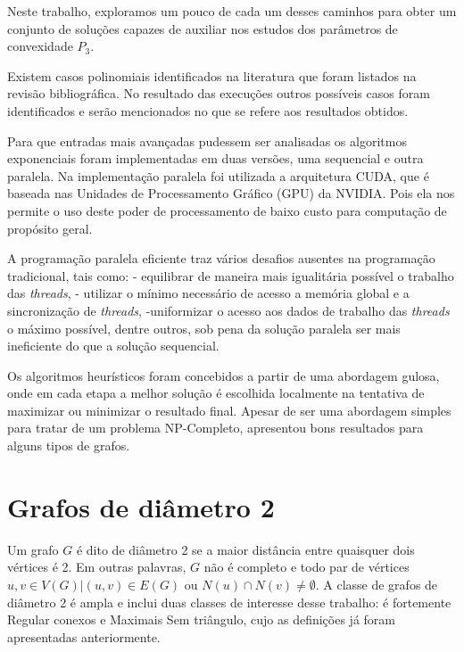 Neste trabalho, exploramos um pouco de cada um desses caminhos
para obter um conjunto de soluções capazes de auxiliar 
nos estudos dos parâmetros de convexidade $P_3$.

Existem casos polinomiais identificados na literatura
que foram listados na revisão bibliográfica. 
No resultado das execuções outros possíveis casos foram identificados
e serão mencionados no que se refere aos resultados obtidos.

Para que entradas mais avançadas pudessem ser analisadas
os algoritmos exponenciais foram implementadas em duas versões, uma sequencial e outra paralela. 
Na implementação paralela foi utilizada a arquitetura CUDA,
que é baseada nas Unidades de Processamento Gráfico (GPU) da NVIDIA.
Pois ela nos permite o uso deste poder de processamento de baixo custo para computação de propósito geral.

A programação paralela eficiente traz vários desafios ausentes na programação tradicional, 
tais como: - equilibrar de maneira mais igualitária possível o trabalho das \textit{threads}, - utilizar o mínimo necessário de acesso a memória global e a sincronização de \textit{threads}, -uniformizar o acesso aos dados de trabalho das \textit{threads} o máximo possível,
dentre outros, sob pena da solução paralela ser mais ineficiente do que a solução sequencial.

Os algoritmos heurísticos foram concebidos a partir de uma abordagem gulosa,
onde em cada etapa a melhor solução é escolhida localmente na 
tentativa de maximizar ou minimizar o resultado final. 
Apesar de ser uma abordagem simples para tratar de um problema NP-Completo,
apresentou bons resultados para alguns tipos de grafos.



\section{Grafos de diâmetro 2}

Um grafo $G$ é dito de diâmetro 2 se a maior distância entre quaisquer dois vértices é 2. Em outras palavras, $G$  não é completo e todo par de vértices $u,v \in V(G)| (u,v) \in E(G)$ ou $N(u) \cap N(v) \ne \emptyset$. A classe de grafos de diâmetro 2 é ampla e inclui duas classes de interesse desse trabalho: é fortemente Regular conexos e Maximais Sem triângulo, cujo as definições já foram apresentadas anteriormente.

